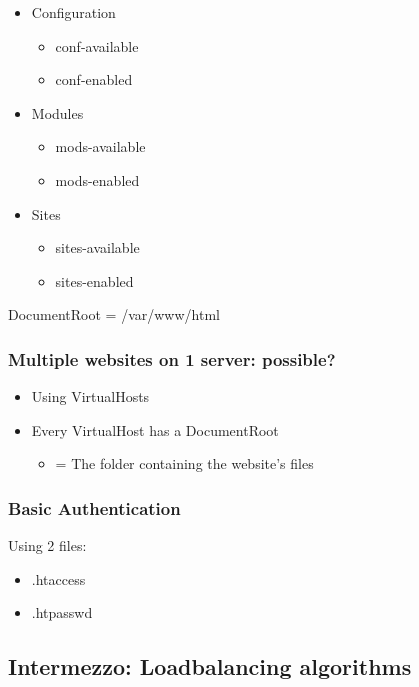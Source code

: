 \documentclass{article}
\begin{document}
\begin{itemize}
    \item Configuration
    \begin{itemize}
        \item conf-available
        \item conf-enabled
    \end{itemize}
    \item Modules
    \begin{itemize}
        \item mods-available
        \item mods-enabled
    \end{itemize}
    \item Sites
    \begin{itemize}
        \item sites-available
        \item sites-enabled
    \end{itemize}
\end{itemize}

DocumentRoot = /var/www/html

\subsubsection{Multiple websites on 1 server: possible?}

\begin{itemize}
    \item Using VirtualHosts
    \item Every VirtualHost has a DocumentRoot
    \begin{itemize}
        \item = The folder containing the website's files
    \end{itemize}
\end{itemize}

\subsubsection{Basic Authentication}

Using 2 files:

\begin{itemize}
    \item .htaccess
    \item .htpasswd
\end{itemize}


\subsection{Intermezzo: Loadbalancing algorithms}
\end{document}
